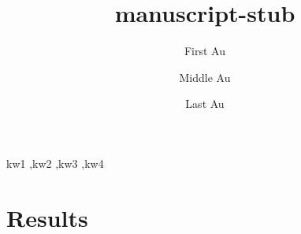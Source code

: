 \documentclass{elsarticle}
\begin{document}
\begin{frontmatter}
\title{manuscript-stub}

\author[1]{First Au}
\author[2,3]{Middle Au}
\author[4]{Last Au}

\address[1]{Affiliation one}
\address[2]{Affiliation two}
\address[3]{Affiliation three}
\address[4]{Affiliation four}


\begin{abstract}

\end{abstract}
\begin{keyword}
kw1 \sep kw2 \sep kw3 \sep kw4
\end{keyword}
\end{frontmatter}
\linenumbers %


\section{Results}









\newpage
\renewcommand{\thefigure}{Figure \arabic{figure}}


\renewcommand{\thefigure}{Figure S\arabic{figure}}
\setcounter{figure}{0} %


\end{document}
